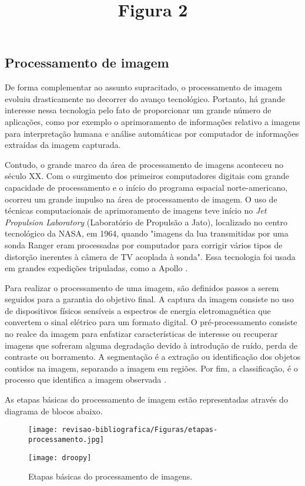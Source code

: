 \subsection{\textbf{Processamento de imagem}}

De forma complementar ao assunto supracitado, o processamento de imagem evoluiu drasticamente no decorrer do avanço tecnológico. Portanto, há grande interesse nessa tecnologia pelo fato de proporcionar um grande número de aplicações, como por exemplo o aprimoramento de informações relativo a imagens para interpretação humana e análise automáticas por computador de informações extraídas da imagem capturada.

Contudo, o grande marco da área de processamento de imagens aconteceu no século XX. Com o surgimento dos primeiros computadores digitais com grande capacidade de processamento e o início do programa espacial norte-americano, ocorreu um grande impulso na área de processamento de imagem. O uso de técnicas computacionais de aprimoramento de imagens teve início no \textit{Jet Propulsion Laboratory} (Laboratório de Propulsão a Jato), localizado no centro tecnológico da NASA, em 1964, quando "imagens da lua transmitidas por uma sonda Ranger eram processadas por computador para corrigir vários tipos de distorção inerentes à câmera de TV acoplada à sonda". Essa tecnologia foi usada em grandes expedições tripuladas, como a Apollo \cite{FILHO1999}.

Para realizar o processamento de uma imagem, são definidos passos a serem seguidos para a garantia do objetivo final. A captura da imagem consiste no uso de dispositivos físicos sensíveis a espectros de energia eletromagnética que convertem o sinal elétrico para um formato digital. O pré-processamento consiste no realce da imagem para enfatizar características de interesse ou recuperar imagens que sofreram alguma degradação devido à introdução de ruído, perda de contraste ou borramento. A segmentação é a extração ou identificação dos objetos contidos na imagem, separando a imagem em regiões. Por fim, a classificação, é o processo que identifica a imagem observada \cite{GONZALEZ2002}.

As etapas básicas do processamento de imagem estão representadas através do diagrama de blocos abaixo.

\title{Figura 2} 
\date{} %
\maketitle
\begin{figure}[h]
\caption{{\footnotesize Etapas básicas do processamento de imagens.}}
 
\centering %
\texttt{[image: revisao-bibliografica/Figuras/etapas-processamento.jpg]} %
\label{figura:figura2}

\centering {}
{
\texttt{[image: droopy]}
\label{figura:figura2}
}
\end{figure}

